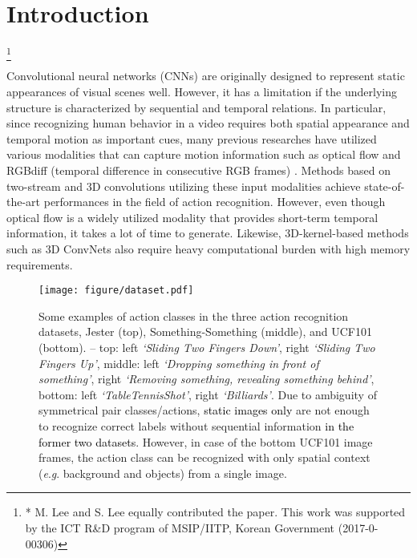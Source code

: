 \documentclass[runningheads]{llncs}
\newcommand{\eg}{\textit{e}.\textit{g}. }
\newcommand{\nj}[1]{\textcolor{black}{#1}}
\newcommand\blfootnote[1]{\begingroup
  \renewcommand\thefootnote{}\footnote{#1}\addtocounter{footnote}{-1}\endgroup
}
\begin{document}
\section{Introduction}
\label{sec:intro}
\blfootnote{* M. Lee and S. Lee equally contributed the paper. This work was supported by the ICT R\&D program of MSIP/IITP, Korean Government (2017-0-00306)}Convolutional neural networks (CNNs) \cite{lecun1995convolutional} are originally designed to represent static appearances of visual scenes well.
However, it has a limitation if the underlying structure is characterized by sequential and temporal relations. In particular, since recognizing human behavior in a video requires both spatial appearance and temporal motion as important cues, many previous researches have utilized various modalities that can capture motion information such as optical flow \cite{wang2016temporal} and RGBdiff (temporal difference in consecutive RGB frames) \cite{wang2016temporal}. Methods based on two-stream \cite{feichtenhofer2016convolutional,ng2015beyond,wang2016temporal} and 3D convolutions \cite{carreira2017quo,tran2015learning} utilizing these input modalities achieve state-of-the-art performances in the field of action recognition. 
However, even though optical flow is a widely utilized modality that provides short-term temporal information, it takes a lot of time to generate. Likewise, 3D-kernel-based methods such as 3D ConvNets also require heavy computational burden with high memory requirements. 

\begin{figure}[t]
\centering
	\label{figure:datasets}    \texttt{[image: figure/dataset.pdf]}
    \caption{Some examples of action classes in the three action recognition datasets, Jester (top), Something-Something (middle), and UCF101 (bottom). -- top: left \textit{`Sliding Two Fingers Down'}, right \textit{`Sliding Two Fingers Up'}, middle: left \textit{`Dropping something in front of something'}, right \textit{`Removing something, revealing something behind'}, bottom: left \textit{`TableTennisShot'}, right \textit{`Billiards'}. 
    Due to ambiguity of symmetrical pair classes/actions, \nj{static images only} are not enough to recognize correct labels without sequential information \nj{in the former two datasets}. However, in case of the bottom UCF101 image frames, the action class can be recognized with only spatial context (\eg background and objects) from a single image.} 
\end{figure}
\end{document}
